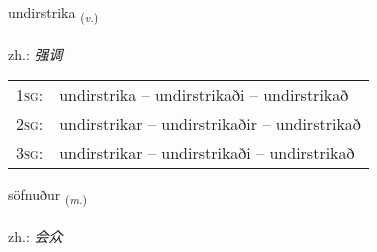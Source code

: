 \documentclass[frontgrid, backgrid]{flacards}\usepackage[]{graphicx}\usepackage[]{xcolor}
\begin{document}
\renewcommand{\blhead}{\vskip5pt {\small\bfseries\footnotesize Sagnorð | 动词 }}
\renewcommand{\bcfoot}{\vskip5pt \hspace{2pt}{\small\bfseries\footnotesize 3K}}


{undirstrika \small{\textsubscript{(\textit{v.})}} \\[1ex] %
 \\
zh.: \emph{强调} \\  [2ex]
\renewcommand*{\arraystretch}{0.8}
\begin{tabular}{p{1cm}l}
\textsc{1sg}: & undirstrika -- undirstrikaði -- undirstrikað \\ 
\textsc{2sg}: & undirstrikar -- undirstrikaðir -- undirstrikað \\ 
\textsc{3sg}: & undirstrikar -- undirstrikaði -- undirstrikað \\ 
\end{tabular}
}

\renewcommand{\flhead}{\vskip5pt \fboxsep=0pt {\small\bfseries\footnotesize Nafnorð | 名词}}
\renewcommand{\fcfoot}{\vskip5pt \fboxsep=0pt \hspace{2pt}{\small\bfseries\footnotesize 3K}}

\renewcommand{\blhead}{\vskip5pt {\small\bfseries\footnotesize Nafnorð | 名词 }}
\renewcommand{\bcfoot}{\vskip5pt \hspace{2pt}{\small\bfseries\footnotesize 3K}}


{söfnuður \small{\textsubscript{(\textit{m.})}} \\[1ex] %
\textphonetic{[sœpnʏðʏr]} \\
zh.: \emph{会众} \\  [2ex]
\renewcommand*{\arraystretch}{0.8}
}
\end{document}
